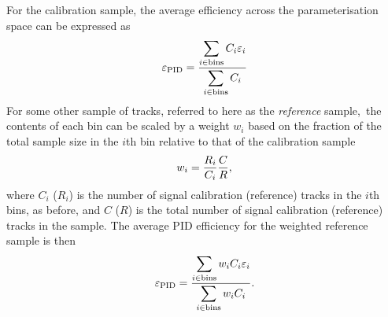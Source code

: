 For the calibration sample, the average efficiency across the parameterisation 
space can be expressed as
\begin{equation}
  \effpid = \frac{%
    \displaystyle\sum_{i \in \textnormal{bins}} C_{i}\eff_{i}
    }{%
    \displaystyle\sum_{i \in \textnormal{bins}} C_{i}
    }
\end{equation}
For some other sample of tracks, referred to here as the \emph{reference} 
sample,\footnotemark\ the contents of each bin can be scaled by a weight 
$w_{i}$ based on the fraction of the total sample size in the $i$th bin 
relative to that of the calibration sample
\begin{equation}
  w_{i} = \frac{%
    R_{i}
  }{%
    C_{i}
  }\frac{%
    C
  }{%
    R
  },
  \label{eqn:prod:effs:pid:ref_weight}
\end{equation}
where $C_{i}$ ($R_{i}$) is the number of signal calibration (reference) tracks 
in the $i$th bins, as before, and $C$ ($R$) is the total number of signal 
calibration (reference) tracks in the sample.
The average \ac{PID} efficiency for the weighted reference sample is then
\begin{equation}
  \effpid = \frac{%
    \displaystyle\sum_{i \in \textnormal{bins}} w_{i}C_{i}\eff_{i}
  }{%
    \displaystyle\sum_{i \in \textnormal{bins}} w_{i}C_{i}
  }.
  \label{eqn:prod:effs:pid:single_track_ref_eff}
\end{equation}


